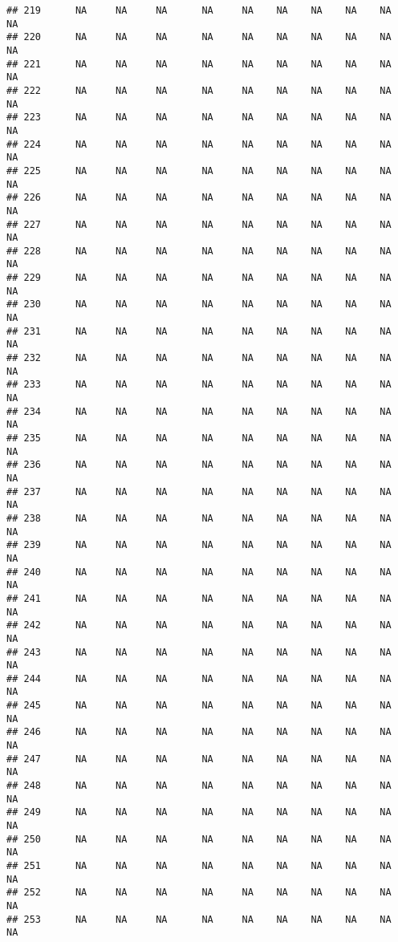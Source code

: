 \documentclass{article}\usepackage{graphicx, color}
\makeatletter
\newenvironment{kframe}{%
 \def\at@end@of@kframe{}%
 \ifinner\ifhmode%
  \def\at@end@of@kframe{\end{minipage}}%
  \begin{minipage}{\columnwidth}%
 \fi\fi%
 \def\FrameCommand##1{\hskip\@totalleftmargin \hskip-\fboxsep
 \colorbox{shadecolor}{##1}\hskip-\fboxsep
     \hskip-\linewidth \hskip-\@totalleftmargin \hskip\columnwidth}%
 \MakeFramed {\advance\hsize-\width
   \@totalleftmargin\z@ \linewidth\hsize
   \@setminipage}}%
 {\par\unskip\endMakeFramed%
 \at@end@of@kframe}
\newenvironment{knitrout}{}{} %
\makeatother
\begin{document}
\begin{knitrout}
\begin{kframe}
\begin{verbatim}
## 219      NA     NA     NA      NA     NA    NA    NA    NA    NA     NA
## 220      NA     NA     NA      NA     NA    NA    NA    NA    NA     NA
## 221      NA     NA     NA      NA     NA    NA    NA    NA    NA     NA
## 222      NA     NA     NA      NA     NA    NA    NA    NA    NA     NA
## 223      NA     NA     NA      NA     NA    NA    NA    NA    NA     NA
## 224      NA     NA     NA      NA     NA    NA    NA    NA    NA     NA
## 225      NA     NA     NA      NA     NA    NA    NA    NA    NA     NA
## 226      NA     NA     NA      NA     NA    NA    NA    NA    NA     NA
## 227      NA     NA     NA      NA     NA    NA    NA    NA    NA     NA
## 228      NA     NA     NA      NA     NA    NA    NA    NA    NA     NA
## 229      NA     NA     NA      NA     NA    NA    NA    NA    NA     NA
## 230      NA     NA     NA      NA     NA    NA    NA    NA    NA     NA
## 231      NA     NA     NA      NA     NA    NA    NA    NA    NA     NA
## 232      NA     NA     NA      NA     NA    NA    NA    NA    NA     NA
## 233      NA     NA     NA      NA     NA    NA    NA    NA    NA     NA
## 234      NA     NA     NA      NA     NA    NA    NA    NA    NA     NA
## 235      NA     NA     NA      NA     NA    NA    NA    NA    NA     NA
## 236      NA     NA     NA      NA     NA    NA    NA    NA    NA     NA
## 237      NA     NA     NA      NA     NA    NA    NA    NA    NA     NA
## 238      NA     NA     NA      NA     NA    NA    NA    NA    NA     NA
## 239      NA     NA     NA      NA     NA    NA    NA    NA    NA     NA
## 240      NA     NA     NA      NA     NA    NA    NA    NA    NA     NA
## 241      NA     NA     NA      NA     NA    NA    NA    NA    NA     NA
## 242      NA     NA     NA      NA     NA    NA    NA    NA    NA     NA
## 243      NA     NA     NA      NA     NA    NA    NA    NA    NA     NA
## 244      NA     NA     NA      NA     NA    NA    NA    NA    NA     NA
## 245      NA     NA     NA      NA     NA    NA    NA    NA    NA     NA
## 246      NA     NA     NA      NA     NA    NA    NA    NA    NA     NA
## 247      NA     NA     NA      NA     NA    NA    NA    NA    NA     NA
## 248      NA     NA     NA      NA     NA    NA    NA    NA    NA     NA
## 249      NA     NA     NA      NA     NA    NA    NA    NA    NA     NA
## 250      NA     NA     NA      NA     NA    NA    NA    NA    NA     NA
## 251      NA     NA     NA      NA     NA    NA    NA    NA    NA     NA
## 252      NA     NA     NA      NA     NA    NA    NA    NA    NA     NA
## 253      NA     NA     NA      NA     NA    NA    NA    NA    NA     NA

\end{verbatim}
\end{kframe}
\end{knitrout}
\end{document}
